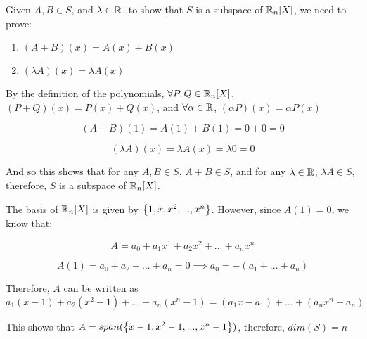 \documentclass[12pt]{article} %
\begin{document}
\begin{homeworkProblem}

    Given $A, B \in S$, and $\lambda \in \mathbb{R}$, to show that $S$ is a subspace of $\mathbb{R}_n[X]$, we need to prove:

    \begin{enumerate}
        \item $(A + B)(x) = A(x) + B(x)$
        \item $(\lambda A)(x) = \lambda A(x)$
    \end{enumerate}

    By the definition of the polynomials, $\forall P, Q \in \mathbb{R}_n[X]$, $(P + Q)(x) = P(x) + Q(x)$, and $\forall \alpha \in \mathbb{R}$, $(\alpha P)(x) = \alpha P(x)$

    $$
        (A + B)(1) = A(1) + B(1) = 0 + 0 = 0
    $$


    $$
        (\lambda A)(x) = \lambda A(x) = \lambda 0 = 0
    $$

    And so this shows that for any $A, B \in S$, $A + B \in S$, and for any $\lambda \in \mathbb{R}$, $\lambda A \in S$, therefore, $S$ is a subspace of $\mathbb{R}_n[X]$.

    The basis of $\mathbb{R}_n[X]$ is given by $\left\{1, x, x^2, ..., x^n\right\}$. However, since $A(1) = 0$, we know that:

    $$
        A = a_0 + a_1 x^1 + a_2 x^2 + ... + a_n x^n
    $$

    $$
        A(1) = a_0 + a_2 + ... + a_n = 0 \implies a_0 = - (a_1 + ... + a_n)
    $$

    Therefore, $A$ can be written as $a_1(x - 1) + a_2(x^2 - 1) + ... + a_n(x^n - 1) = (a_1 x - a_1) + ... + (a_n x^n - a_n)$

    This shows that $A = span(\left\{x - 1, x^2 - 1, ..., x^n - 1\right\})$, therefore, $dim(S) = n$
\end{homeworkProblem}
\pagebreak
\end{document}
